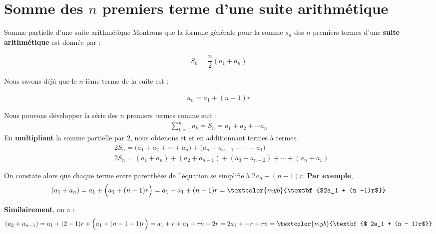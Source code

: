 \documentclass{report}
\begin{document}
    \section{Somme des $n$ premiers terme d'une suite \textcolor{myb}{\textbf{arithmétique}}}
    \begin{Preuve}{Somme partielle d'une suite arithmétique}{}
        Montrons que la formule générale pour la somme $s_n$ des $n$ premiers 
        termes d'une \textbf{suite arithmétique} est donnée par : 

        \begin{align*}
            S_n = \dfrac{n}{2}(a_1 + a_n) 
        \end{align*}

        Nous savons déjà que le $n$-ième terme de la suite est : 

        \begin{align*}
            a_n = a_1 + (n - 1)r
        \end{align*}                    

        Nous pouvons développer la série des $n$ premiers termes comme suit : 
        \begin{align*}
        \sum\limits_{k=1}^{n }a_k = S_n = a_1 + a_2 + \cdots a_n 
        \end{align*}
        En \textbf{multipliant} la somme partielle par $2$, nous obtenons et 
        et en additionnant termes à termes.
        \begin{align*}
            &2S_n =
            \bigl(a_1 + a_2 + \cdots  + a_n \bigr) +
            \bigl( a_n + a_{n -1} + \cdots  + a_1 \bigr)
            \\
            &2S_n = (a_1 + a_n) + (a_2 + a_{n - 1}) + (a_3 + a_{n - 2}) + \cdots 
            + (a_n + a_1)
        \end{align*}

        On constate alors que chaque terme entre parenthèse de l'équation  
        se simplifie à $2a_n + (n - 1)r$. \textbf{Par exemple}, 
        \begin{align*}
            (a_1 + a_n) = a_1 + \Bigl(a_1 + (n - 1)r \Bigr) = 
            a_1 + a_1 + (n -1)r = \textcolor{myb}{\textbf{$2a_1 + (n -1)r$}}  
        \end{align*}

        \textbf{Similairement}, on a :
        \begin{align*}
            (a_2 + a_{n-1}) = a_1 + (2 - 1)r + \Bigl(a_1 + (n - 1 - 1)r \Bigr) = 
            a_1 +r + a_1 +rn -2r = 2a_1 + -r +rn =
            \textcolor{myb}{\textbf{$ 2a_1 + (n - 1)r$}} 
        \end{align*}


\end{Preuve}
\end{document}
